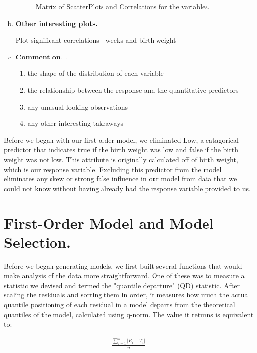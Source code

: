 \documentclass{article}\usepackage[]{graphicx}\usepackage[]{xcolor}
\makeatletter
\newenvironment{kframe}{%
 \def\at@end@of@kframe{}%
 \ifinner\ifhmode%
  \def\at@end@of@kframe{\end{minipage}}%
  \begin{minipage}{\columnwidth}%
 \fi\fi%
 \def\FrameCommand##1{\hskip\@totalleftmargin \hskip-\fboxsep
 \colorbox{shadecolor}{##1}\hskip-\fboxsep
     \hskip-\linewidth \hskip-\@totalleftmargin \hskip\columnwidth}%
 \MakeFramed {\advance\hsize-\width
   \@totalleftmargin\z@ \linewidth\hsize
   \@setminipage}}%
 {\par\unskip\endMakeFramed%
 \at@end@of@kframe}
\newenvironment{knitrout}{}{} %
\makeatother
\begin{document}
\begin{enumerate}[a.]
\begin{figure}[H]
\begin{knitrout}
\begin{kframe}
{\ttfamily\noindent\bfseries\color{errorcolor}{\#\# Error in eval(expr, envir, enclos): object 'correlationsmatrix' not found}}\end{kframe}
\end{knitrout}
\caption{Matrix of ScatterPlots and Correlations for the variables.}
\label{CorrelationSummary}
\end{figure}

\item\textbf{Other interesting plots.}

Plot significant correlations 
- weeks and birth weight

\item\textbf{Comment on...}
\begin{enumerate}[]
\item{the shape of the distribution of each variable}
\item{the relationship between the response and the quantitative predictors}
\item{any unusual looking observations}
\item{any other interesting takeaways}
\end{enumerate}
\end{enumerate}

Before we began with our first order model, we eliminated Low, a catagorical predictor that indicates true if the birth weight was low and false if the birth weight was not low. This attribute is originally calculated off of birth weight, which is our response variable. Excluding this predictor from the model eliminates any skew or strong false influence in our model from data that we could not know without having already had the response variable provided to us.

\section{First-Order Model and Model Selection.}

Before we began generating models, we first built several functions that would make analysis of the data more straightforward. One of these was to measure a statistic we devised and termed the "quantile departure" (QD) statistic. After scaling the residuals and sorting them in order, it measures how much the actual quantile positioning of each residual in a model departs from the theoretical quantiles of the model, calculated using q-norm. The value it returns is equivalent to: 

\begin{align*}
\frac{\sum_{i=1}^{n}|R_i - T_i|}{n}
\end{align*}
\end{document}
